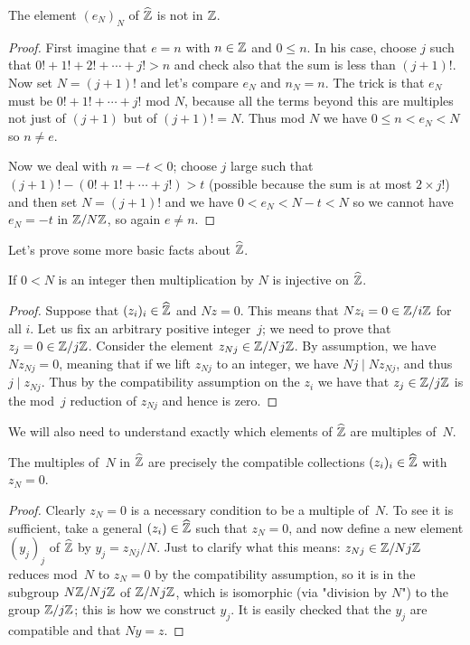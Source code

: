 \begin{lemma}
    \label{ZHat.e_not_in_Int}
    \leanok
    The element $(e_N)_N$ of $\widehat{\mathbb{Z}}$ is not in $\mathbb{Z}$.
\end{lemma}
\begin{proof}
    First imagine that $e=n$ with $n\in\mathbb{Z}$ and $0\leq n$. In his case, choose $j$
    such that $0!+1!+2!+\cdots+j!>n$ and check also that the sum is less
    than $(j+1)!$. Now set $N=(j+1)!$ and let's compare $e_N$
    and $n_N=n$. The trick is that $e_N$ must be $0!+1!+\cdots+j!$ mod $N$,
    because all the terms beyond this are multiples not just of $(j+1)$ but
    of $(j+1)!=N$. Thus mod $N$ we have $0\leq n<e_N<N$ so $n\not=e$.

    Now we deal with $n=-t<0$; choose $j$ large such that
    $(j+1)!-(0!+1!+\cdots+j!)>t$ (possible because the sum is at most $2\times j!$)
    and then set $N=(j+1)!$ and we have $0 < e_N<N-t<N$ so we cannot have $e_N=-t$ in $\mathbb{Z}/N\mathbb{Z}$,
    so again $e\not=n$.
\end{proof}

Let's prove some more basic facts about $\widehat{\mathbb{Z}}$.

\begin{lemma}
    \label{ZHat.torsionfree}
    \leanok
    If $0<N$ is an integer then multiplication by $N$ is injective on $\widehat{\mathbb{Z}}$.
\end{lemma}
\begin{proof}
    \leanok
    Suppose that $(z_i)_i\in\widehat{\mathbb{Z}}$ and $Nz=0$. This means that $Nz_i=0\in\mathbb{Z}/i\mathbb{Z}$ for all $i$.
    Let us fix an arbitrary positive integer~$j$; we need to prove that $z_j=0\in\mathbb{Z}/j\mathbb{Z}$.
    Consider the element $z_{Nj}\in\mathbb{Z}/Nj\mathbb{Z}$. By assumption, we have $Nz_{Nj}=0$, meaning that
    if we lift $z_{Nj}$ to an integer, we have $Nj\mid Nz_{Nj}$, and thus $j\mid z_{Nj}$.
    Thus by the compatibility assumption on the $z_i$ we have that $z_j\in\mathbb{Z}/j\mathbb{Z}$ is the
    mod~$j$ reduction of $z_{Nj}$ and hence is zero.
\end{proof}

We will also need to understand exactly which elements of $\widehat{\mathbb{Z}}$
are multiples of~$N$.

\begin{lemma}
    \label{ZHat.multiples}
    \leanok
    The multiples of~$N$ in $\widehat{\mathbb{Z}}$ are precisely the compatible collections $(z_i)_i\in\widehat{\mathbb{Z}}$
    with $z_N=0$.
\end{lemma}
\begin{proof} \leanok
    Clearly $z_N=0$ is a necessary condition to be a multiple of~$N$. To see it is sufficient,
    take a general $(z_i)\in\widehat{\mathbb{Z}}$ such that $z_N=0$,
    and now define a new element $(y_j)_j$ of $\widehat{\mathbb{Z}}$
    by $y_j=z_{Nj}/N$. Just to clarify what this means: $z_{Nj}\in\mathbb{Z}/Nj\mathbb{Z}$ reduces mod~$N$
    to $z_N=0$ by the compatibility assumption, so it is in the subgroup $N\mathbb{Z}/Nj\mathbb{Z}$ of $\mathbb{Z}/Nj\mathbb{Z}$,
    which is isomorphic (via "division by $N$") to the group $\mathbb{Z}/j\mathbb{Z}$; this is how we construct
    $y_j$. It is easily checked that the $y_j$ are compatible and that $Ny=z$.
\end{proof}

